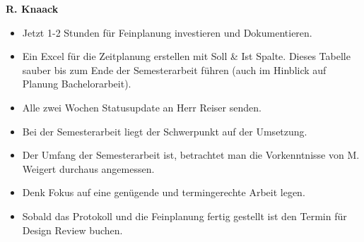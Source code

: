 \textbf{R. Knaack}
\begin{itemize}
	\item Jetzt 1-2 Stunden für Feinplanung investieren und Dokumentieren.
	\item Ein Excel für die Zeitplanung erstellen mit Soll \& Ist Spalte. Dieses Tabelle sauber 
	bis zum Ende der Semesterarbeit führen (auch im Hinblick auf Planung Bachelorarbeit).
	\item Alle zwei Wochen Statusupdate an Herr Reiser senden.
	\item Bei der Semesterarbeit liegt der Schwerpunkt auf der Umsetzung.
	\item Der Umfang der Semesterarbeit ist, betrachtet man die Vorkenntnisse von M. Weigert durchaus angemessen.
	\item Denk Fokus auf eine genügende und termingerechte Arbeit legen.
	\item Sobald das Protokoll und die Feinplanung fertig gestellt ist den Termin für Design Review buchen. 
\end{itemize}